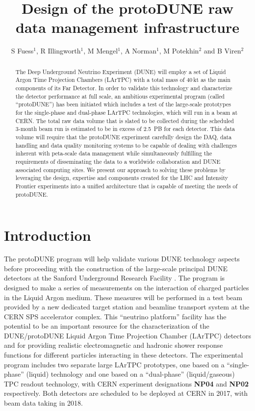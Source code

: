 \documentclass[a4paper]{jpconf}
\newcommand{\pd}{protoDUNE\xspace}
\begin{document}
\title{Design of the \pd raw data management infrastructure}

\author{S Fuess$^1$, R Illingworth$^1$, M Mengel$^1$, A Norman$^1$, M Potekhin$^2$ and B Viren$^2$}

\address{$^1$ Fermi National Accelerator Laboratory, Batavia, IL 60510, USA}
\address{$^2$ Brookhaven National Laboratory, Upton, NY 11973, USA}


\begin{abstract}
The Deep Underground Neutrino Experiment (DUNE) will employ a set of
Liquid Argon Time Projection Chambers (LArTPC) with a total mass of 40\,kt
as the main components of its Far Detector.
In order to validate this technology and characterize the
detector performance at full scale, an
ambitious experimental program (called ``\pd'') has been
initiated which includes a test of the large-scale prototypes for the
single-phase and dual-phase LArTPC technologies, which will run in a beam
at CERN. The total raw data volume
that is slated to be collected during the scheduled 3-month beam run is
estimated to be in excess of 2.5~PB for each detector.  This data
volume will require that the protoDUNE experiment carefully design the DAQ, data handling and
data quality monitoring systems to be capable of dealing with
challenges inherent with peta-scale data management while
simultaneously fulfilling the requirements of disseminating the data to
a worldwide collaboration and DUNE associated computing sites. We present our approach to solving these problems by
leveraging the design, expertise and components created for the LHC and Intensity Frontier
experiments into a unified architecture that is capable of meeting the
needs of \pd. 
\end{abstract}

\section{Introduction}
The \pd program will help validate various DUNE technology aspects before proceeding with
the construction of the large-scale principal DUNE detectors at the Sanford Underground Research Facility \cite{cdrVol1, cdrVol4}.
The program is designed to make a series of measurements on the
interaction of charged particles in the Liquid Argon medium.  These
measures will be performed in a test beam provided by a new dedicated
target station and beamline transport system at the CERN SPS
accelerator complex.  This ``neutrino platform'' facility has the
potential to be an important resource for the characterization of the DUNE/protoDUNE
Liquid Argon Time Projection Chamber (LArTPC) detectors and for
providing realistic electromagnetic and hadronic shower response
functions for different particles interacting in these detectors. 
The experimental program includes two separate
large LArTPC prototypes, one based on a ``single-phase'' (liquid) technology and
one based on a ``dual-phase'' (liquid/gaseous) TPC readout technology,
with CERN experiment designations \textbf{NP04} and \textbf{NP02}
respectively.  Both detectors are scheduled to be deployed at CERN in
2017, with beam data taking in 2018.
\end{document}
